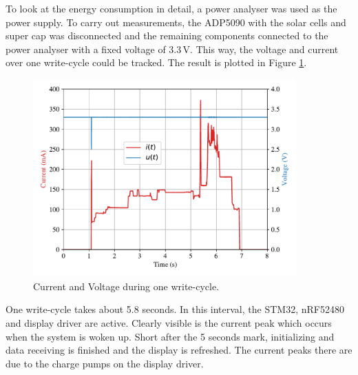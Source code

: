 To look at the energy consumption in detail, a power analyser was used as the power supply.
To carry out measurements, the ADP5090 with the solar cells and super cap was disconnected and the remaining components connected to the power analyser with a fixed voltage of 3.3\,V.
This way, the voltage and current over one write-cycle could be tracked.
The result is plotted in Figure \ref{results:ui}.
\begin{figure}[ht]
	\centering
	\includegraphics[width=0.9\textwidth]{5-results/energy/logger/ui.pdf}
	\caption{Current and Voltage during one write-cycle.\label{results:ui}}
\end{figure}
One write-cycle takes about 5.8 seconds.
In this interval, the STM32, nRF52480 and display driver are active.
Clearly visible is the current peak which occurs when the system is woken up.
Short after the 5 seconds mark, initializing and data receiving is finished and the display is refreshed.
The current peaks there are due to the charge pumps on the display driver.

